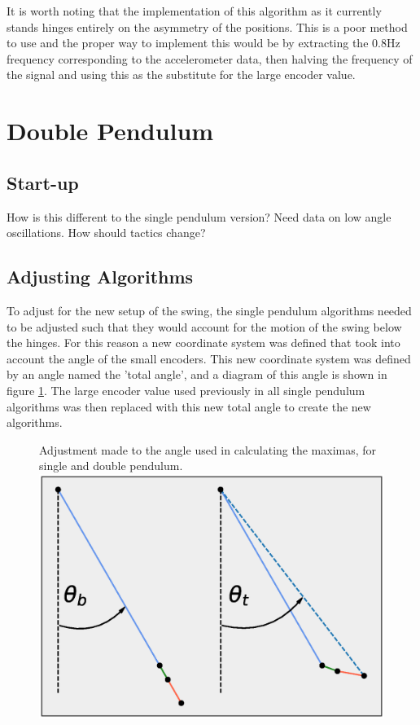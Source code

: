 \documentclass[11pt]{article}
\newcommand*\ruleline[1]{\par\noindent\raisebox{.8ex}{\makebox[\linewidth]{\hrulefill\hspace{1ex}\raisebox{-.8ex}{#1}\hspace{1ex}\hrulefill}}}
\begin{document}
It is worth noting that the implementation of this algorithm as it currently stands hinges entirely on the asymmetry of the positions. This is a poor method to use and the proper way to implement this would be by extracting the $0.8$Hz frequency corresponding to the accelerometer data, then halving the frequency of the signal and using this as the substitute for the large encoder value.

\clearpage


\section{Double Pendulum}
\subsection{Start-up}
\ruleline{James Doering}
How is this different to the single pendulum version? Need data on low angle oscillations. How should tactics change?

\subsection{Adjusting Algorithms}\label{sec:AdjustingAlgorithms}
\ruleline{George Sheppard}
To adjust for the new setup of the swing, the single pendulum algorithms needed to be adjusted such that they would account for the motion of the swing below the hinges. For this reason a new coordinate system was defined that took into account the angle of the small encoders. This new coordinate system was defined by an angle named the 'total angle', and a diagram of this angle is shown in figure \ref{fig:TotalAngleDiagram}. The large encoder value used previously in all single pendulum algorithms was then replaced with this new total angle to create the new algorithms.

    \begin{figure}[!htb]
        \centering
        \captionbox
             {Adjustment made to the angle used in calculating the maximas, for single and double pendulum.\label{fig:TotalAngleDiagram}}
             {\includegraphics[width=1.0\textwidth]{TotalAngleDiagram.eps}}
    \end{figure}
    
\end{document}
